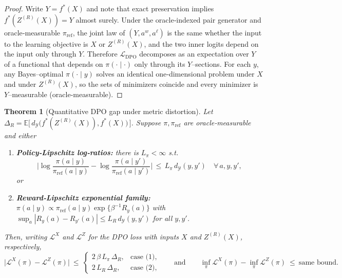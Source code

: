 \documentclass[11pt]{article}
\newtheorem{theorem}{Theorem}
\newcommand{\Y}{\mathcal{Y}}               %
\newcommand{\fstar}{f^*}               %
\newcommand{\E}{\mathbb{E}}
\newcommand{\metric}{d_{\Y}}
\begin{document}
\begin{proof}
Write $Y=\fstar(X)$ and note that exact preservation implies $\fstar(Z^{(R)}(X))=Y$ almost surely. Under the oracle‑indexed pair generator and oracle‑measurable $\pi_{\mathrm{ref}}$, the joint law of $(Y,a^w,a^\ell)$ is the same whether the input to the learning objective is $X$ or $Z^{(R)}(X)$, and the two inner logits depend on the input only through $Y$. Therefore $\mathcal L_{\mathrm{DPO}}$ decomposes as an expectation over $Y$ of a functional that depends on $\pi(\cdot\mid\cdot)$ only through its $Y$–sections. For each $y$, any Bayes–optimal $\pi(\cdot\mid y)$ solves an identical one‑dimensional problem under $X$ and under $Z^{(R)}(X)$, so the sets of minimizers coincide and every minimizer is $Y$–measurable (oracle‑measurable).
\end{proof}

\begin{theorem}[Quantitative DPO gap under metric distortion]\label{thm:dpo-gap}
Let $\Delta_R=\E\big[\,\metric\!\big(\fstar(Z^{(R)}(X)),\fstar(X)\big)\,\big]$. Suppose $\pi,\pi_{\mathrm{ref}}$ are oracle‑measurable and either
\begin{enumerate}
\item \textbf{Policy‑Lipschitz log‑ratios:} there is $L_\pi<\infty$ s.t.
\[
\Bigg|\log\frac{\pi(a\mid y)}{\pi_{\mathrm{ref}}(a\mid y)}-\log\frac{\pi(a\mid y')}{\pi_{\mathrm{ref}}(a\mid y')}\Bigg|\,\le\,L_\pi\,\metric(y,y')\quad\forall\,a,y,y',
\]
or
\item \textbf{Reward‑Lipschitz exponential family:} $\pi(a\mid y)\propto \pi_{\mathrm{ref}}(a\mid y)\exp\{\beta^{-1}R_y(a)\}$ with $\sup_a|R_y(a)-R_{y'}(a)|\le L_R\,\metric(y,y')$ for all $y,y'$.
\end{enumerate}
Then, writing $\mathcal L^{X}$ and $\mathcal L^{Z}$ for the DPO loss with inputs $X$ and $Z^{(R)}(X)$, respectively,
\[
\big|\mathcal L^{X}(\pi)-\mathcal L^{Z}(\pi)\big|
\ \le\
\begin{cases}
2\,\beta\,L_\pi\,\Delta_R,&\text{case (1)},\\[2pt]
2\,L_R\,\Delta_R,&\text{case (2)},
\end{cases}
\qquad
\text{and}\qquad
\inf_\pi \mathcal L^{X}(\pi)-\inf_\pi \mathcal L^{Z}(\pi)\ \le\ \text{same bound}.
\]
\end{theorem}
\end{document}
